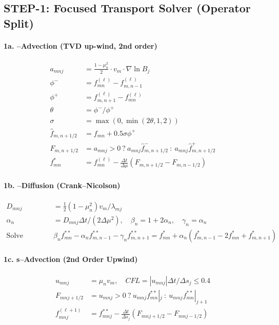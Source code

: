 {\subsection*{STEP-1: Focused Transport Solver (Operator Split)}

\paragraph{1a. \mu--Advection (TVD up-wind, 2nd order)}
\begin{align*}
a_{mnj} &= \frac{1 - \mu_n^2}{2} \cdot v_m \cdot \nabla \ln B_j \\
\phi^- &= f_{mn}^{(\ell)} - f_{m,n-1}^{(\ell)} \\
\phi^+ &= f_{m,n+1}^{(\ell)} - f_{mn}^{(\ell)} \\
\theta &= \phi^- / \phi^+ \\
\sigma &= \max(0, \min(2\theta, 1, 2)) \\
\hat{f}_{m,n+1/2} &= f_{mn} + 0.5 \sigma \phi^+ \\
F_{m,n+1/2} &= a_{mnj} > 0\ ?\ a_{mnj} \hat{f}_{m,n+1/2}^-\ :\ a_{mnj} \hat{f}_{m,n+1/2}^+ \\
f_{mn}^* &= f_{mn}^{(\ell)} - \frac{\Delta t}{\Delta \mu} (F_{m,n+1/2} - F_{m,n-1/2})
\end{align*}

\paragraph{1b. \mu--Diffusion (Crank--Nicolson)}
\begin{align*}
D_{mnj} &= \frac{1}{2}(1 - \mu_n^2) v_m / \lambda_{mj} \\
\alpha_n &= D_{mnj} \Delta t / (2 \Delta \mu^2),\quad \beta_n = 1 + 2\alpha_n,\quad \gamma_n = \alpha_n \\
\text{Solve tridiagonal system:}\quad &\beta_n f_{mn}^{**} - \alpha_n f_{m,n-1}^{**} - \gamma_n f_{m,n+1}^{**} = f_{mn}^* + \alpha_n(f_{m,n-1}^* - 2f_{mn}^* + f_{m,n+1}^*)
\end{align*}

\paragraph{1c. s--Advection (2nd Order Upwind)}
\begin{align*}
u_{mnj} &= \mu_n v_m,\quad CFL = |u_{mnj}| \Delta t / \Delta s_j \leq 0.4 \\
F_{mnj+1/2} &= u_{mnj} > 0\ ?\ u_{mnj} f_{mn}^{**}|_{j}\ :\ u_{mnj} f_{mn}^{**}|_{j+1} \\
f_{mnj}^{(\ell+1)} &= f_{mnj}^{**} - \frac{\Delta t}{\Delta s_j} (F_{mnj+1/2} - F_{mnj-1/2})
\end{align*}

}
